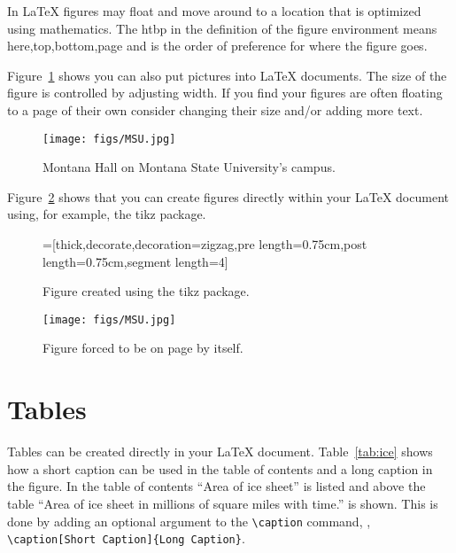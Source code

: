 In \LaTeX{} figures may float and move around to a location that is optimized using mathematics. The htbp in the definition of the figure environment means here,top,bottom,page and is the order of preference for where the figure goes.  

Figure~\ref{fig:photo} shows you can also put pictures into \LaTeX{} documents.  The size of the figure is controlled by adjusting width.  If you find your figures are often floating to a page of their own consider changing their size and/or adding more text.

\begin{figure}[htbp]
  \centering
  \texttt{[image: figs/MSU.jpg]}
  \caption{Montana Hall on Montana State University's campus.}
  \label{fig:photo}
\end{figure}

Figure~\ref{fig:tikz} shows that you can create figures directly within your \LaTeX{} document using, for example, the tikz package.
\begin{figure}[htbp]
  \centering
  =[thick,decorate,decoration={zigzag,pre length=0.75cm,post length=0.75cm,segment length=4}]
  \caption{Figure created using the tikz package.}
  \label{fig:tikz}
\end{figure}

\begin{figure}[P!]
  \centering
  \texttt{[image: figs/MSU.jpg]}
  \caption{Figure forced to be on page by itself.}
  \label{fig:page}
\end{figure}

\clearpage

\section{Tables}\label{Sect:tabs}
Tables can be created directly in your \LaTeX{} document.  Table~\ref{tab:ice} shows how a short caption can be used in the table of contents and a long caption in the figure.  In the table of contents ``Area of ice sheet'' is listed and above the table ``Area of ice sheet in millions of square miles with time.'' is shown.  This is done by adding an optional argument to the \verb|\caption| command, \ie, \verb|\caption[Short Caption]{Long Caption}|.

